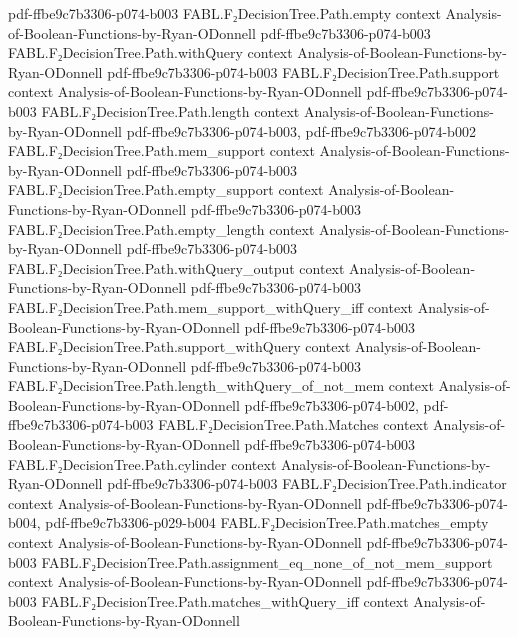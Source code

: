 \begin{theorem}
  {pdf-ffbe9c7b3306-p074-b003}
\proofstep
  {FABL.F₂DecisionTree.Path.empty}
  {context}
  {Analysis-of-Boolean-Functions-by-Ryan-ODonnell}
  {pdf-ffbe9c7b3306-p074-b003}
\proofstep
  {FABL.F₂DecisionTree.Path.withQuery}
  {context}
  {Analysis-of-Boolean-Functions-by-Ryan-ODonnell}
  {pdf-ffbe9c7b3306-p074-b003}
\proofstep
  {FABL.F₂DecisionTree.Path.support}
  {context}
  {Analysis-of-Boolean-Functions-by-Ryan-ODonnell}
  {pdf-ffbe9c7b3306-p074-b003}
\proofstep
  {FABL.F₂DecisionTree.Path.length}
  {context}
  {Analysis-of-Boolean-Functions-by-Ryan-ODonnell}
  {pdf-ffbe9c7b3306-p074-b003,
    pdf-ffbe9c7b3306-p074-b002}
\proofstep
  {FABL.F₂DecisionTree.Path.mem_support}
  {context}
  {Analysis-of-Boolean-Functions-by-Ryan-ODonnell}
  {pdf-ffbe9c7b3306-p074-b003}
\proofstep
  {FABL.F₂DecisionTree.Path.empty_support}
  {context}
  {Analysis-of-Boolean-Functions-by-Ryan-ODonnell}
  {pdf-ffbe9c7b3306-p074-b003}
\proofstep
  {FABL.F₂DecisionTree.Path.empty_length}
  {context}
  {Analysis-of-Boolean-Functions-by-Ryan-ODonnell}
  {pdf-ffbe9c7b3306-p074-b003}
\proofstep
  {FABL.F₂DecisionTree.Path.withQuery_output}
  {context}
  {Analysis-of-Boolean-Functions-by-Ryan-ODonnell}
  {pdf-ffbe9c7b3306-p074-b003}
\proofstep
  {FABL.F₂DecisionTree.Path.mem_support_withQuery_iff}
  {context}
  {Analysis-of-Boolean-Functions-by-Ryan-ODonnell}
  {pdf-ffbe9c7b3306-p074-b003}
\proofstep
  {FABL.F₂DecisionTree.Path.support_withQuery}
  {context}
  {Analysis-of-Boolean-Functions-by-Ryan-ODonnell}
  {pdf-ffbe9c7b3306-p074-b003}
\proofstep
  {FABL.F₂DecisionTree.Path.length_withQuery_of_not_mem}
  {context}
  {Analysis-of-Boolean-Functions-by-Ryan-ODonnell}
  {pdf-ffbe9c7b3306-p074-b002,
    pdf-ffbe9c7b3306-p074-b003}
\proofstep
  {FABL.F₂DecisionTree.Path.Matches}
  {context}
  {Analysis-of-Boolean-Functions-by-Ryan-ODonnell}
  {pdf-ffbe9c7b3306-p074-b003}
\proofstep
  {FABL.F₂DecisionTree.Path.cylinder}
  {context}
  {Analysis-of-Boolean-Functions-by-Ryan-ODonnell}
  {pdf-ffbe9c7b3306-p074-b003}
\proofstep
  {FABL.F₂DecisionTree.Path.indicator}
  {context}
  {Analysis-of-Boolean-Functions-by-Ryan-ODonnell}
  {pdf-ffbe9c7b3306-p074-b004,
    pdf-ffbe9c7b3306-p029-b004}
\proofstep
  {FABL.F₂DecisionTree.Path.matches_empty}
  {context}
  {Analysis-of-Boolean-Functions-by-Ryan-ODonnell}
  {pdf-ffbe9c7b3306-p074-b003}
\proofstep
  {FABL.F₂DecisionTree.Path.assignment_eq_none_of_not_mem_support}
  {context}
  {Analysis-of-Boolean-Functions-by-Ryan-ODonnell}
  {pdf-ffbe9c7b3306-p074-b003}
\proofstep
  {FABL.F₂DecisionTree.Path.matches_withQuery_iff}
  {context}
  {Analysis-of-Boolean-Functions-by-Ryan-ODonnell}

\end{theorem}
